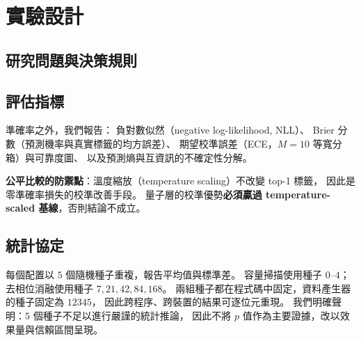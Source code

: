 \documentclass[11pt,a4paper]{ctexart}
\begin{document}
\section{實驗設計}

\subsection{研究問題與決策規則}

\begin{table}[t]
\centering
\caption{研究問題與事前決定的決策規則。規則先寫定，負面結果才算結果，而不是事後重新詮釋。}
\end{table}


\subsection{評估指標}

準確率之外，我們報告： 負對數似然（negative log-likelihood, NLL）、
Brier 分數（預測機率與真實標籤的均方誤差）、
期望校準誤差（ECE，\(M = 10\) 等寬分箱）與可靠度圖、
以及預測熵與互資訊的不確定性分解。

\textbf{公平比較的防禦點}：溫度縮放（temperature scaling）不改變 top-1
標籤， 因此是零準確率損失的校準改善手段。
量子層的校準優勢\textbf{必須贏過 temperature-scaled
基線}，否則結論不成立。

\subsection{統計協定}

每個配置以 \(5\) 個隨機種子重複，報告平均值與標準差。 容量掃描使用種子
\(0\)--\(4\)；去相位消融使用種子 \(7,21,42,84,168\)。
兩組種子都在程式碼中固定，資料產生器的種子固定為 \(12345\)，
因此跨程序、跨裝置的結果可逐位元重現。 我們明確聲明：\(5\)
個種子不足以進行嚴謹的統計推論， 因此不將 \(p\)
值作為主要證據，改以效果量與信賴區間呈現。
\end{document}
